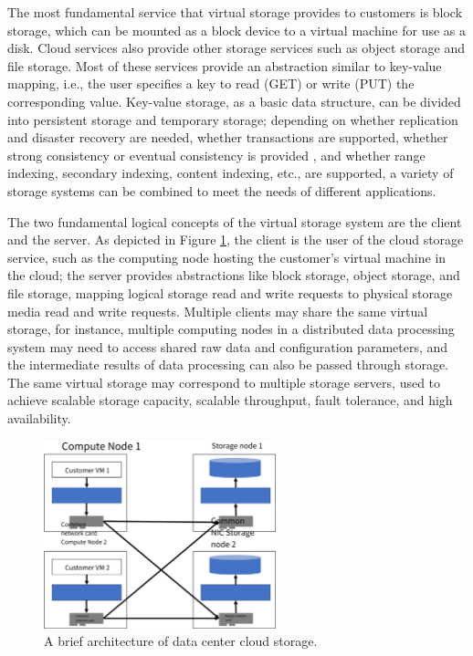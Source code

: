 The most fundamental service that virtual storage provides to customers is block storage, which can be mounted as a block device to a virtual machine for use as a disk. Cloud services also provide other storage services such as object storage and file storage. Most of these services provide an abstraction similar to key-value mapping, i.e., the user specifies a key to read (GET) or write (PUT) the corresponding value. Key-value storage, as a basic data structure, can be divided into persistent storage and temporary storage; depending on whether replication and disaster recovery are needed, whether transactions are supported, whether strong consistency or eventual consistency is provided \cite{anna}, and whether range indexing, secondary indexing, content indexing, etc., are supported, a variety of storage systems can be combined to meet the needs of different applications.

The two fundamental logical concepts of the virtual storage system are the client and the server. As depicted in Figure \ref{background:fig:storage_arch}, the client is the user of the cloud storage service, such as the computing node hosting the customer's virtual machine in the cloud; the server provides abstractions like block storage, object storage, and file storage, mapping logical storage read and write requests to physical storage media read and write requests. Multiple clients may share the same virtual storage, for instance, multiple computing nodes in a distributed data processing system may need to access shared raw data and configuration parameters, and the intermediate results of data processing can also be passed through storage. The same virtual storage may correspond to multiple storage servers, used to achieve scalable storage capacity, scalable throughput, fault tolerance, and high availability.

\begin{figure}[htbp]
	\centering
	\includegraphics[width=0.6\textwidth]{figures/storage_arch.pdf}
	\caption{A brief architecture of data center cloud storage.}
	\label{background:fig:storage_arch}
\end{figure}

